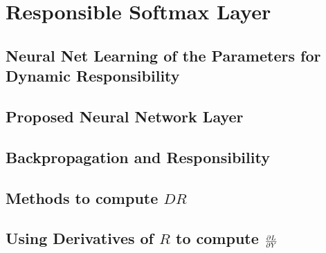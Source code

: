 %
%
	\chapter{Responsible Softmax Layer}\label{respLayer}
		
	\section{Neural Net Learning of the Parameters for Dynamic Responsibility}
		
	\section{Proposed Neural Network Layer}
		
	\section{Backpropagation and Responsibility}
		
	\section{Methods to compute $DR$}
		
	\section{Using Derivatives of $R$ to compute \( \pdv{L}{Y} \)}
		
	
%